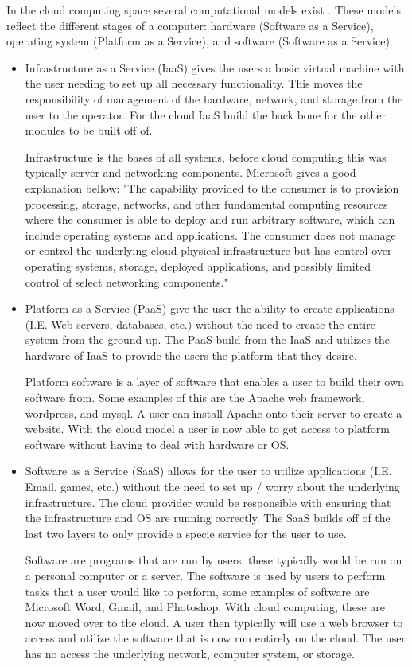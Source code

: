\documentclass[12pt]{article}
\begin{document}
In the cloud computing space several computational models exist \cite{wikipedia}. These models reflect the different stages of a computer: hardware (Software as a Service), operating system (Platform as a Service), and software (Software as a Service).

\begin{itemize}
    \item Infrastructure as a Service (IaaS) gives the users a basic virtual machine with the user needing to set up all necessary functionality. This moves the responsibility of management of the hardware, network, and storage from the user to the operator. For the cloud IaaS build the back bone for the other modules to be built off of.

        Infrastructure is the bases of all systems, before cloud computing this was typically server and networking components. Microsoft gives a good explanation bellow:
        "The capability provided to the consumer is to provision processing, storage, networks, and other fundamental computing resources where the consumer is able to deploy and run arbitrary software, which can include operating systems and applications. The consumer does not manage or control the underlying cloud physical infrastructure but has control over operating systems, storage, deployed applications, and possibly limited control of select networking components." \cite{TechWikiMic}

    \item Platform as a Service (PaaS) give the user the ability to create applications (I.E. Web servers, databases, etc.) without the need to create the entire system from the ground up. The PaaS build from the IaaS and utilizes the hardware of IaaS to provide the users the platform that they desire.

        Platform software is a layer of software that enables a user to build their own software from. Some examples of this are the Apache web framework, wordpress, and mysql. A user can install Apache onto their server to create a website. With the cloud model a user is now able to get access to platform software without having to deal with hardware or OS.

    \item Software as a Service (SaaS) allows for the user to utilize applications (I.E. Email, games, etc.) without the need to set up / worry about the underlying infrastructure. The cloud provider would be responsible with ensuring that the infrastructure and OS are running correctly. The SaaS builds off of the last two layers to only provide a specie service for the user to use.

        Software are programs that are run by users, these typically would be run on a personal computer or a server. The software is used by users to perform tasks that a user would like to perform, some examples of software are Microsoft Word, Gmail, and Photoshop. With cloud computing, these are now moved over to the cloud. A user then typically will use a web browser to access and utilize the software that is now run entirely on the cloud. The user has no access the underlying network, computer system, or storage.


\end{itemize}
\end{document}
